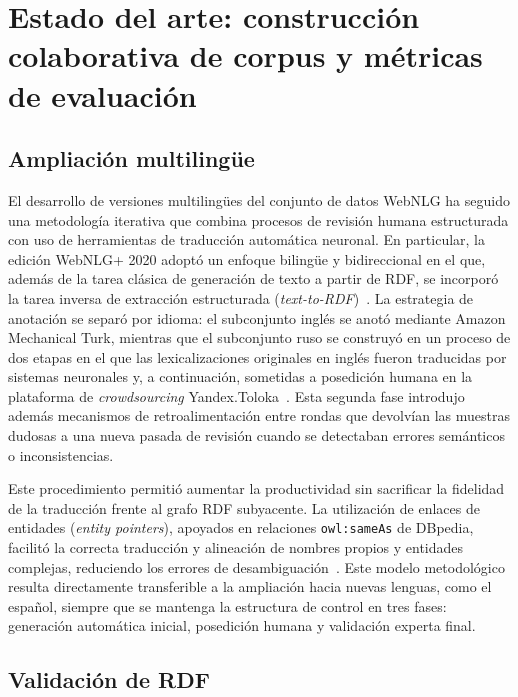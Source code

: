 
\chapter{Estado del arte: construcción colaborativa de corpus y métricas de evaluación}

\section{Ampliación multilingüe}

El desarrollo de versiones multilingües del conjunto de datos WebNLG ha seguido
una metodología iterativa que combina procesos de revisión humana estructurada
con uso de herramientas de traducción automática neuronal. En particular, la
edición WebNLG+ 2020 adoptó un enfoque bilingüe y bidireccional en el que,
además de la tarea clásica de generación de texto a partir de RDF, se incorporó
la tarea inversa de extracción estructurada
(\textit{text-to-RDF})~\cite{CastroFerreira2020}. La estrategia de anotación se
separó por idioma: el subconjunto inglés se anotó mediante Amazon Mechanical
Turk, mientras que el subconjunto ruso se construyó en un proceso de dos etapas
en el que las lexicalizaciones originales en inglés fueron traducidas por
sistemas neuronales y, a continuación, sometidas a posedición humana en la
plataforma de \textit{crowdsourcing} Yandex.Toloka~\cite{CastroFerreira2020}.
Esta segunda fase introdujo además mecanismos de retroalimentación entre rondas
que devolvían las muestras dudosas a una nueva pasada de revisión cuando se
detectaban errores semánticos o inconsistencias.

Este procedimiento permitió aumentar la productividad sin sacrificar la
fidelidad de la traducción frente al grafo RDF subyacente. La utilización de
enlaces de entidades (\textit{entity pointers}), apoyados en relaciones
\texttt{owl:sameAs} de DBpedia, facilitó la correcta traducción y alineación de
nombres propios y entidades complejas, reduciendo los errores de
desambiguación~\cite{CastroFerreira2020,Lehmann2015}. Este modelo metodológico
resulta directamente transferible a la ampliación hacia nuevas lenguas, como el
español, siempre que se mantenga la estructura de control en tres fases:
generación automática inicial, posedición humana y validación experta final.

\section{Validación de RDF}

